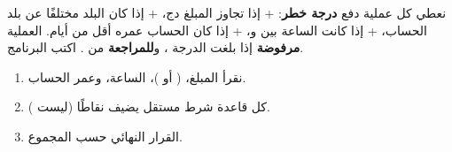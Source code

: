 \begin{statement}
نعطي كل عملية دفع \textbf{درجة خطر}: + إذا تجاوز المبلغ  دج، + إذا كان البلد مختلفًا عن بلد الحساب، + إذا كانت الساعة بين  و، + إذا كان الحساب عمره أقل من  أيام. العملية \textbf{مرفوضة} إذا بلغت الدرجة ، و\textbf{للمراجعة} من . اكتب البرنامج.
\end{statement}
\begin{stepsbox}\begin{enumerate}
\item نقرأ المبلغ،  ( أو )، الساعة، وعمر الحساب.
\item كل قاعدة شرط مستقل  يضيف نقاطًا (ليست ).
\item القرار النهائي حسب المجموع.
\end{enumerate}\end{stepsbox}
